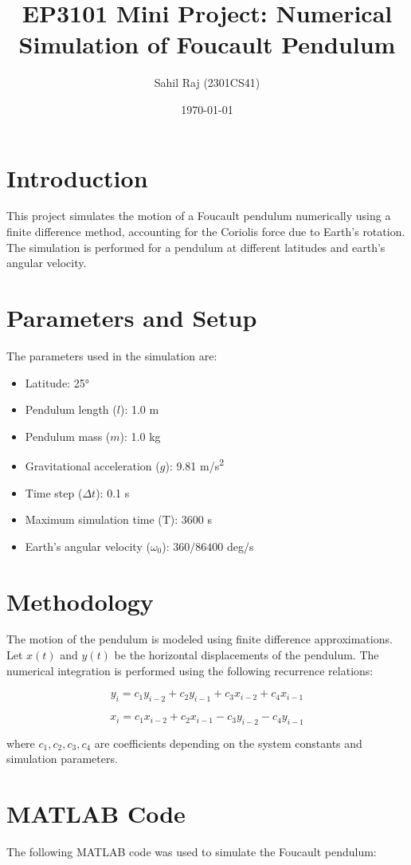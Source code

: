 \documentclass[12pt,a4paper]{article}
\title{\textbf{EP3101 Mini Project:} Numerical Simulation of Foucault Pendulum}
\author{Sahil Raj (2301CS41)}
\date{\today}
\begin{document}
\maketitle

\section{Introduction}
This project simulates the motion of a Foucault pendulum numerically using a finite difference
method, accounting for the Coriolis force due to Earth's rotation. The simulation is performed
for a pendulum at different latitudes and earth's angular velocity.

\section{Parameters and Setup}
The parameters used in the simulation are:

\begin{itemize}
    \item Latitude: 25°
    \item Pendulum length ($l$): 1.0 m
    \item Pendulum mass ($m$): 1.0 kg
    \item Gravitational acceleration ($g$): 9.81 m/s\textsuperscript{2}
    \item Time step ($\Delta t$): 0.1 s
    \item Maximum simulation time (T): 3600 s
    \item Earth's angular velocity ($\omega_{0}$): $360/86400$ deg/s
\end{itemize}

\section{Methodology}
The motion of the pendulum is modeled using finite difference approximations. Let $x(t)$ and $y(t)$
be the horizontal displacements of the pendulum. The numerical integration is performed using the
following recurrence relations:

\[
y_i = c_1 y_{i-2} + c_2 y_{i-1} + c_3 x_{i-2} + c_4 x_{i-1}
\]

\[
x_i = c_1 x_{i-2} + c_2 x_{i-1} - c_3 y_{i-2} - c_4 y_{i-1}
\]

where $c_1, c_2, c_3, c_4$ are coefficients depending on the system constants and simulation
parameters.

\section{MATLAB Code}
The following MATLAB code was used to simulate the Foucault pendulum:
\end{document}
